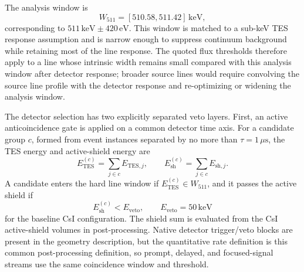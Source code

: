 \documentclass[preprint,12pt]{elsarticle}
\newcommand{\keV}{\,\mathrm{keV}}
\newcommand{\wii}{W_{511}}
\begin{document}
The analysis window is
\begin{equation}
  \wii = [510.58,511.42]\keV,
\end{equation}
corresponding to $511\keV\pm420\,\mathrm{eV}$. This window is matched to a sub-keV TES response assumption and is narrow enough to suppress continuum background while retaining most of the line response.
The quoted flux thresholds therefore apply to a line whose intrinsic width remains small compared with this analysis window after detector response; broader source lines would require convolving the source line profile with the detector response and re-optimizing or widening the analysis window.

The detector selection has two explicitly separated veto layers. First, an
active anticoincidence gate is applied on a common detector time axis. For a
candidate group $c$, formed from event instances separated by no more than
$\tau=1\,\mu\mathrm{s}$, the TES energy and active-shield energy are
\begin{equation}
  E_{\mathrm{TES}}^{(c)}=\sum_{j\in c}E_{\mathrm{TES},j},\qquad
  E_{\mathrm{sh}}^{(c)}=\sum_{j\in c}E_{\mathrm{sh},j}.
\end{equation}
A candidate enters the hard line window if $E_{\mathrm{TES}}^{(c)}\in\wii$,
and it passes the active shield if
\begin{equation}
  E_{\mathrm{sh}}^{(c)} < E_{\mathrm{veto}}, \qquad E_{\mathrm{veto}}=50\keV
\end{equation}
for the baseline CsI configuration. The shield sum is evaluated from the CsI
active-shield volumes in post-processing. Native detector trigger/veto blocks
are present in the geometry description, but the quantitative rate definition is
this common post-processing definition, so prompt, delayed, and focused-signal
streams use the same coincidence window and threshold.
\end{document}
